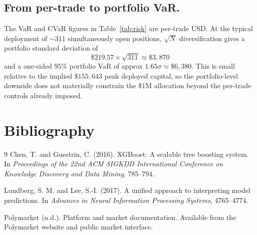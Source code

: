 \documentclass[11pt,a4paper]{article}
\newcommand{\edit}[1]{#1}
\begin{document}
\subsection{From per-trade to portfolio VaR.}
The VaR and CVaR figures in Table~\ref{tab:risk} are per-trade
USD. At the typical deployment of $\sim 311$ simultaneously open
positions, $\sqrt{N}$ diversification gives a portfolio standard
deviation of 
\[
\$219.57 \times \sqrt{311} \approx \$3{,}870
\] 
and a one-sided $95\%$ portfolio VaR of approx
$1.65\sigma \approx \$6{,}380$. This is small relative to the
implied $\$155{,}643$ peak deployed capital, so the portfolio-level
downside does not materially constrain the $\$1\text{M}$ allocation
beyond the per-trade controls already imposed.

\section{\edit{Bibliography}}

\begin{thebibliography}{9}
\edit{Chen, T. and Guestrin, C. (2016). XGBoost: A scalable tree boosting system. In \emph{Proceedings of the 22nd ACM SIGKDD International Conference on Knowledge Discovery and Data Mining}, 785--794.}

\edit{Lundberg, S. M. and Lee, S.-I. (2017). A unified approach to interpreting model predictions. In \emph{Advances in Neural Information Processing Systems}, 4765--4774.}

\edit{Polymarket (n.d.). Platform and market documentation. Available from the Polymarket website and public market interface.}
\end{thebibliography}
\end{document}
